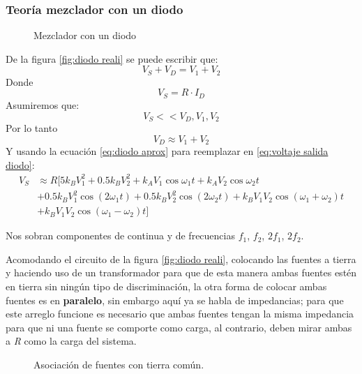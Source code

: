 \documentclass[
	12pt, %
	fleqn, %
	a4paper, %
	oneside, %
]{LegrandOrangeBook}
\begin{document}
\subsubsection{Teoría mezclador con un diodo}
\begin{figure}[H]
\centering
{}
\caption{Mezclador con un diodo}
\end{figure}
De la figura \ref{fig:diodo reali} se puede escribir que:
\begin{equation}
V_S+V_D=V_1+V_2
\end{equation}
Donde
\begin{equation}
V_S=R\cdot I_D
\label{eq:voltaje salida diodo}
\end{equation}
Asumiremos que:
\begin{equation}
V_S<<V_D, V_1, V_2
\end{equation}
Por lo tanto
\begin{equation}
V_D\approx V_1+V_2
\end{equation}
Y usando la ecuación \ref{eq:diodo aprox} para reemplazar en \ref{eq:voltaje salida diodo}:
\begin{equation}
    \begin{split}
        V_S&\approx R[5k_BV_1^2+0.5k_BV_2^2+k_AV_1\cos\omega_1t+k_AV_2\cos\omega_2t\\
&+0.5k_BV_1^2\cos(2\omega_1t)+0.5k_BV_2^2\cos(2\omega_2t)+k_BV_1V_2\cos(\omega_1+\omega_2)t\\
&+k_BV_1V_2\cos(\omega_1-\omega_2)t]
    \end{split}
    \label{eq:Vs mezclador 1 diodo}
\end{equation}
\begin{notation}
Nos sobran componentes de continua y de frecuencias $f_1$, $f_2$, $2f_1$, $2f_2$.
\end{notation}
Acomodando el circuito de la figura \ref{fig:diodo reali}, colocando las fuentes a tierra y haciendo uso de un transformador para que de esta manera ambas fuentes estén en tierra sin ningún tipo de discriminación, la otra forma de colocar ambas fuentes es en \textbf{paralelo}, sin embargo aquí ya se habla de impedancias; para que este arreglo funcione es necesario que ambas fuentes tengan la misma impedancia para que ni una fuente se comporte como carga, al contrario, deben mirar ambas a \textit{R} como la carga del sistema.
\begin{figure}[H]
\centering
{}
\caption{Asociación de fuentes con tierra común.}
\end{figure}
\end{document}
